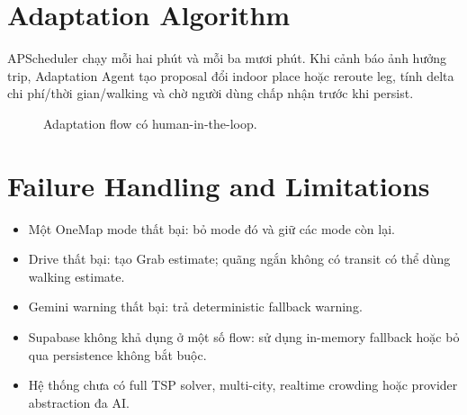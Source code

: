 \section{Adaptation Algorithm}

APScheduler chạy  mỗi hai phút và  mỗi ba mươi phút. Khi cảnh báo ảnh hưởng trip, Adaptation Agent tạo proposal đổi indoor place hoặc reroute leg, tính delta chi phí/thời gian/walking và chờ người dùng chấp nhận trước khi persist.

\begin{figure}[H]
\centering
{}
\caption{Adaptation flow có human-in-the-loop.}
\label{fig:adaptation-flow}
\end{figure}

\section{Failure Handling and Limitations}

\begin{itemize}
  \item Một OneMap mode thất bại: bỏ mode đó và giữ các mode còn lại.
  \item Drive thất bại: tạo Grab estimate; quãng ngắn không có transit có thể dùng walking estimate.
  \item Gemini warning thất bại: trả deterministic fallback warning.
  \item Supabase không khả dụng ở một số flow: sử dụng in-memory fallback hoặc bỏ qua persistence không bắt buộc.
  \item Hệ thống chưa có full TSP solver, multi-city, realtime crowding hoặc provider abstraction đa AI.
\end{itemize}
